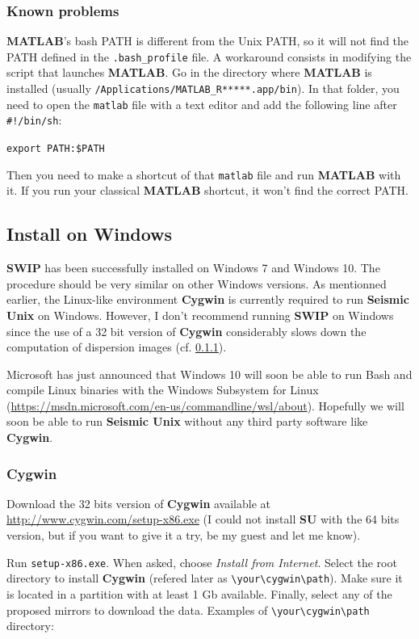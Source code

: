 \documentclass[twoside,a4paper]{article}
\def\SWIP{\textbf{SWIP}}
\def\SU{\textbf{SU}}
\def\SeismicUnix{\textbf{Seismic Unix}}
\def\MATLAB{\textbf{MATLAB}}
\def\Cygwin{\textbf{Cygwin}}
\begin{document}
\subsubsection{Known problems}
{\MATLAB}'s bash PATH is different from the Unix PATH, so it will not find the PATH defined in the \verb|.bash_profile| file. A workaround consists in modifying the script that launches {\MATLAB}. Go in the directory where {\MATLAB} is installed (usually \verb|/Applications/MATLAB_R*****.app/bin|). In that folder, you need to open the \verb|matlab| file with a text editor and add the following line after \verb|#!/bin/sh|:

\verb|export PATH:$PATH|

Then you need to make a shortcut of that \verb|matlab| file and run {\MATLAB} with it. If you run your classical {\MATLAB} shortcut, it won't find the correct PATH.

\clearpage
\subsection{Install on Windows}
{\SWIP} has been successfully installed on Windows 7 and Windows 10. The procedure should be very similar on other Windows versions. As mentionned earlier, the Linux-like environment {\Cygwin} is currently required to run {\SeismicUnix} on Windows. However, I don't recommend running {\SWIP} on Windows since the use of a 32 bit version of {\Cygwin} considerably slows down the computation of dispersion images (cf. \ref{sec:cygwin}).

Microsoft has just announced that Windows 10 will soon be able to run Bash and compile Linux binaries with the Windows Subsystem for Linux (\url{https://msdn.microsoft.com/en-us/commandline/wsl/about}). Hopefully we will soon be able to run {\SeismicUnix} without any third party software like {\Cygwin}.

\subsubsection{Cygwin}
\label{sec:cygwin}
Download the 32 bits version of {\Cygwin} available at \url{http://www.cygwin.com/setup-x86.exe} (I could not install {\SU} with the 64 bits version, but if you want to give it a try, be my guest and let me know).

Run \verb|setup-x86.exe|. When asked, choose \textit{Install from Internet}. Select the root directory to install {\Cygwin} (refered later as \verb|\your\cygwin\path|). Make sure it is located in a partition with at least 1 Gb available. Finally, select any of the proposed mirrors to download the data.
Examples of \verb|\your\cygwin\path| directory:
\end{document}
